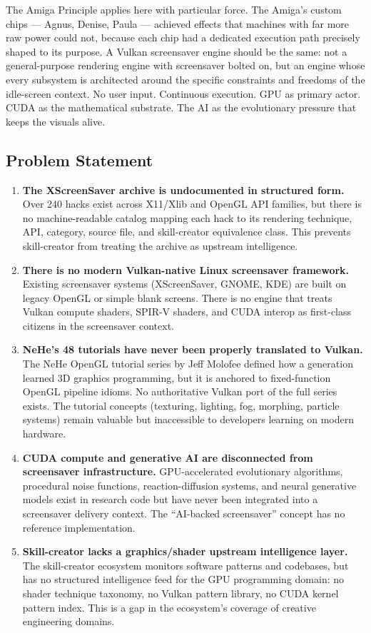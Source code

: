 \documentclass[11pt,letterpaper]{article}
\begin{document}
The Amiga Principle applies here with particular force. The Amiga's custom chips --- Agnus, Denise, Paula --- achieved effects that machines with far more raw power could not, because each chip had a dedicated execution path precisely shaped to its purpose. A Vulkan screensaver engine should be the same: not a general-purpose rendering engine with screensaver bolted on, but an engine whose every subsystem is architected around the specific constraints and freedoms of the idle-screen context. No user input. Continuous execution. GPU as primary actor. CUDA as the mathematical substrate. The AI as the evolutionary pressure that keeps the visuals alive.

\subsection{Problem Statement}

\begin{enumerate}
\item \textbf{The XScreenSaver archive is undocumented in structured form.} Over 240 hacks exist across X11/Xlib and OpenGL API families, but there is no machine-readable catalog mapping each hack to its rendering technique, API, category, source file, and skill-creator equivalence class. This prevents skill-creator from treating the archive as upstream intelligence.

\item \textbf{There is no modern Vulkan-native Linux screensaver framework.} Existing screensaver systems (XScreenSaver, GNOME, KDE) are built on legacy OpenGL or simple blank screens. There is no engine that treats Vulkan compute shaders, SPIR-V shaders, and CUDA interop as first-class citizens in the screensaver context.

\item \textbf{NeHe's 48 tutorials have never been properly translated to Vulkan.} The NeHe OpenGL tutorial series by Jeff Molofee defined how a generation learned 3D graphics programming, but it is anchored to fixed-function OpenGL pipeline idioms. No authoritative Vulkan port of the full series exists. The tutorial concepts (texturing, lighting, fog, morphing, particle systems) remain valuable but inaccessible to developers learning on modern hardware.

\item \textbf{CUDA compute and generative AI are disconnected from screensaver infrastructure.} GPU-accelerated evolutionary algorithms, procedural noise functions, reaction-diffusion systems, and neural generative models exist in research code but have never been integrated into a screensaver delivery context. The ``AI-backed screensaver'' concept has no reference implementation.

\item \textbf{Skill-creator lacks a graphics/shader upstream intelligence layer.} The skill-creator ecosystem monitors software patterns and codebases, but has no structured intelligence feed for the GPU programming domain: no shader technique taxonomy, no Vulkan pattern library, no CUDA kernel pattern index. This is a gap in the ecosystem's coverage of creative engineering domains.
\end{enumerate}
\end{document}

